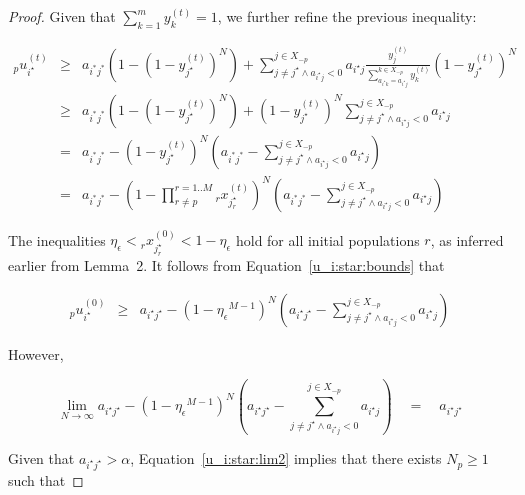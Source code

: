 \documentclass{acm_proc_article-sp}
\begin{document}
\begin{proof}
Given that $\sum_{k=1}^{m} y^{(t)}_k = 1$, we further refine the previous inequality:

\noindent\begin{eqnarray}
\nonumber {_p}u^{(t)}_{i^\star} & \geq & a_{i^* j^*} \left( 1 - \left( 1 - y^{(t)}_{j^\star} \right) ^N \right) + \sum^{j \in X_{-p}}_{j \neq j^\star \wedge a_{i^\star j} < 0} { a_{i^\star j} \frac{ y^{(t)}_j}{ \sum^{k \in X_{-p}}_{a_{i^\star k} = a_{i^\star j} } y^{(t)}_k} \left( 1 - y^{(t)}_{j^\star} \right)^N }\\
\nonumber & \geq & a_{i^* j^*} \left( 1 - \left( 1 - y^{(t)}_{j^\star} \right) ^N \right) + \left( 1 - y^{(t)}_{j^\star} \right)^N \sum^{j \in X_{-p}}_{j \neq j^\star \wedge a_{i^\star j} < 0} { a_{i^\star j} }\\
& = & a_{i^* j^*} - \left( 1 - y^{(t)}_{j^\star} \right) ^N \left( a_{i^* j^*}  - \sum^{j \in X_{-p}}_{j \neq j^\star \wedge a_{i^\star j} < 0} { a_{i^\star j} } \right)\\
& = & a_{i^* j^*} - \left( 1 - \prod^{r=1..M}_{r \ne p} {_r}x^{(t)}_{j_r^\star} \right) ^N \left( a_{i^* j^*}  - \sum^{j \in X_{-p}}_{j \neq j^\star \wedge a_{i^\star j} < 0} { a_{i^\star j} } \right) \label{u_i:star:bounds}
\end{eqnarray}

The inequalities $\eta_\epsilon < {_r}x^{(0)}_{j_r^\star} < 1 - \eta_\epsilon$ hold for all initial populations $r$, as inferred earlier from Lemma~2.  It follows from Equation~\ref{u_i:star:bounds} that

\begin{eqnarray}
{_p}u^{(0)}_{i^\star} & \geq & a_{i^\star j^\star} - \left( 1 - {\eta_\epsilon}^{M-1} \right) ^N \left( a_{i^\star j^\star}  - \sum^{j \in X_{-p}}_{j \neq j^\star \wedge a_{i^\star j} < 0} { a_{i^\star j} } \right) \label{u_i:star:lower:bound}
\end{eqnarray}

However,

\begin{equation}
\lim_{N \rightarrow \infty} a_{i^\star j^\star} - \left( 1 - {\eta_\epsilon}^{M-1} \right) ^N \left( a_{i^\star j^\star}  - \sum^{j \in X_{-p}}_{j \neq j^\star \wedge a_{i^\star j} < 0} { a_{i^\star j} } \right) \quad = \quad a_{i^\star j^\star} \label{u_i:star:lim2}
\end{equation}

Given that $a_{i^\star j^\star} > \alpha$, Equation~\ref{u_i:star:lim2} implies that there exists $N_p \geq 1$ such that


\end{proof}
\end{document}
